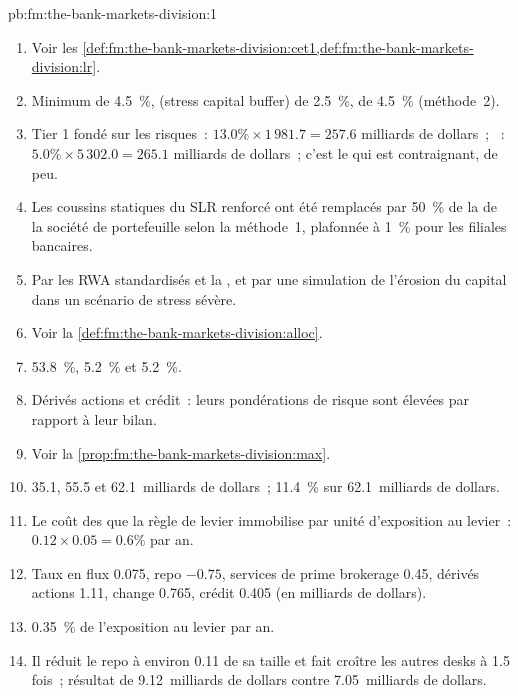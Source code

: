 \begin{solution}{pb:fm:the-bank-markets-division:1}
\begin{enumerate}
\item Voir les \cref{def:fm:the-bank-markets-division:cet1,def:fm:the-bank-markets-division:lr}.
\item Minimum de 4.5~\%,  (stress capital buffer) de 2.5~\%,  de 4.5~\% (méthode~2).
\item Tier 1 fondé sur les risques~: $13.0\%\times1\,981.7=257.6$ milliards de dollars~; ~: $5.0\%\times5\,302.0=265.1$ milliards de dollars~; c'est le  qui est contraignant, de peu.
\item Les coussins statiques du SLR renforcé ont été remplacés par 50~\% de la  de la société de portefeuille selon la méthode~1, plafonnée à 1~\% pour les filiales bancaires.
\item Par les RWA standardisés et la , et par une simulation de l'érosion du capital dans un scénario de stress sévère.
\item Voir la \cref{def:fm:the-bank-markets-division:alloc}.
\item 53.8~\%, 5.2~\% et 5.2~\%.
\item Dérivés actions et crédit~: leurs pondérations de risque sont élevées par rapport à leur bilan.
\item Voir la \cref{prop:fm:the-bank-markets-division:max}.
\item 35.1, 55.5 et 62.1~milliards de dollars~; 11.4~\% sur 62.1~milliards de dollars.
\item Le coût des  que la règle de levier immobilise par unité d'exposition au levier~: $0.12\times0.05=0.6\%$ par an.
\item Taux en flux 0.075, repo $-0.75$, services de prime brokerage 0.45, dérivés actions 1.11, change 0.765, crédit 0.405 (en milliards de dollars).
\item 0.35~\% de l'exposition au levier par an.
\item Il réduit le repo à environ 0.11 de sa taille et fait croître les autres desks à 1.5 fois~; résultat de 9.12~milliards de dollars contre 7.05~milliards de dollars.

\end{enumerate}
\end{solution}
